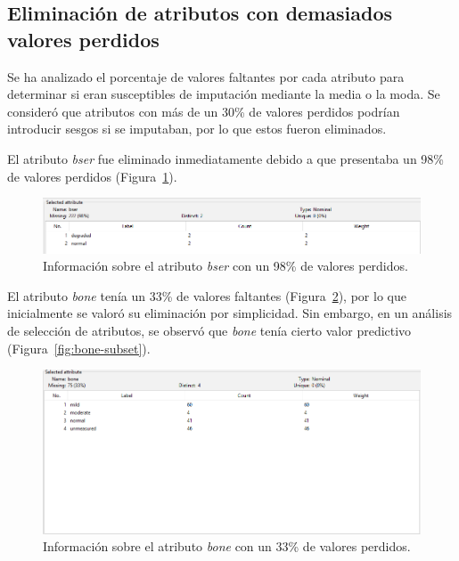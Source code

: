 \documentclass{article}
\begin{document}
\newpage
\subsection{Eliminación de atributos con demasiados valores perdidos}

Se ha analizado el porcentaje de valores faltantes por cada atributo para determinar si eran susceptibles de imputación mediante la media o la moda. Se consideró que atributos con más de un 30\% de valores perdidos podrían introducir sesgos si se imputaban, por lo que estos fueron eliminados. 

El atributo \textit{bser} fue eliminado inmediatamente debido a que presentaba un 98\% de valores perdidos (Figura~\ref{fig:bser}).

\begin{figure}[!ht]
    \centering
    \includegraphics[width=1\linewidth]{Imágenes/attribute_bser.png}
    \caption{Información sobre el atributo \textit{bser} con un 98\% de valores perdidos.}
    \label{fig:bser}
\end{figure}

El atributo \textit{bone} tenía un 33\% de valores faltantes (Figura~\ref{fig:bone-delete}), por lo que inicialmente se valoró su eliminación por simplicidad. Sin embargo, en un análisis de selección de atributos, se observó que \textit{bone} tenía cierto valor predictivo (Figura~\ref{fig:bone-subset}).

\begin{figure}[!ht]
    \centering
    \includegraphics[width=\linewidth]{Imágenes/bone-attribute.png}
    \caption{Información sobre el atributo \textit{bone} con un 33\% de valores perdidos.}
    \label{fig:bone-delete}
\end{figure}
\end{document}

